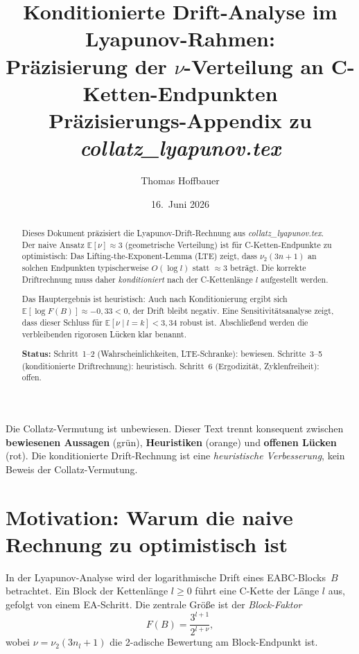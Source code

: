 \documentclass[12pt,a4paper]{article}
\title{%
  Konditionierte Drift-Analyse im Lyapunov-Rahmen:\\[0.3em]
  Präzisierung der $\nu$-Verteilung an C-Ketten-Endpunkten\\[0.5em]
  \large Präzisierungs-Appendix zu \textit{collatz\_lyapunov.tex}%
}
\author{Thomas Hoffbauer}
\date{16.\ Juni 2026}
\newcommand{\vii}{\nu_2}
\newcommand{\E}{\mathbb{E}}
\newcommand{\logF}{\log F(B)}
\begin{document}
\maketitle

\begin{abstract}
Dieses Dokument präzisiert die Lyapunov-Drift-Rechnung aus
\textit{collatz\_lyapunov.tex}.
Der naive Ansatz $\E[\nu] \approx 3$ (geometrische Verteilung) ist für
C-Ketten-Endpunkte zu optimistisch: Das Lifting-the-Exponent-Lemma (LTE)
zeigt, dass $\vii(3n+1)$ an solchen Endpunkten typischerweise
$O(\log l)$ statt $\approx 3$ beträgt.
Die korrekte Driftrechnung muss daher \emph{konditioniert} nach der
C-Kettenlänge $l$ aufgestellt werden.

Das Hauptergebnis ist heuristisch: Auch nach Konditionierung ergibt sich
$\E[\logF] \approx -0{,}33 < 0$, der Drift bleibt negativ.
Eine Sensitivitätsanalyse zeigt, dass dieser Schluss für
$\E[\nu \mid l{=}k] < 3{,}34$ robust ist.
Abschließend werden die verbleibenden rigorosen Lücken klar benannt.

\medskip
\noindent\textbf{Status:}
\textcolor{bewiesengrün}{Schritt~1--2 (Wahrscheinlichkeiten, LTE-Schranke): bewiesen.}
\textcolor{warnorange}{Schritte~3--5 (konditionierte Driftrechnung): heuristisch.}
\textcolor{lückenrot}{Schritt~6 (Ergodizität, Zyklenfreiheit): offen.}
\end{abstract}

\tableofcontents
\bigskip

\begin{tcolorbox}[warnung, title={Einordnung dieses Dokuments}]
Die Collatz-Vermutung ist unbewiesen.
Dieser Text trennt konsequent zwischen
\textbf{bewiesenen Aussagen} (grün),
\textbf{Heuristiken} (orange)
und \textbf{offenen Lücken} (rot).
Die konditionierte Drift-Rechnung ist eine \emph{heuristische Verbesserung},
kein Beweis der Collatz-Vermutung.
\end{tcolorbox}

\section{Motivation: Warum die naive Rechnung zu optimistisch ist}
\label{sec:motivation}

In der Lyapunov-Analyse wird der logarithmische Drift eines
EABC-Blocks~$B$ betrachtet.
Ein Block der Kettenlänge $l \geq 0$ führt eine C-Kette der Länge $l$
aus, gefolgt von einem EA-Schritt.
Die zentrale Größe ist der \emph{Block-Faktor}
\[
  F(B) = \frac{3^{l+1}}{2^{l+\nu}},
\]
wobei $\nu = \vii(3n_l + 1)$ die 2-adische Bewertung am Block-Endpunkt ist.
\end{document}
